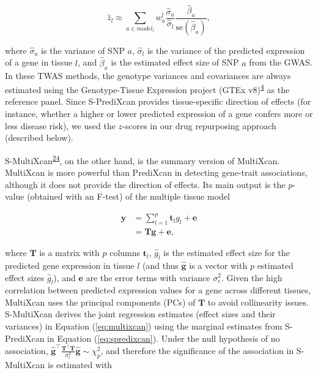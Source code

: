 \documentclass[
  a4paper,
]{article}
\begin{document}
\begin{equation}
\hat{z}_{l} \approx \sum_{a \in model_{l}} w_a^l \frac{\hat{\sigma}_a}{\hat{\sigma}_l} \frac{\hat{\beta}_a}{\mathrm{se}(\hat{\beta}_a)},
\label{eq:spredixcan}\end{equation}

where \(\hat{\sigma}_a\) is the variance of SNP \(a\), \(\hat{\sigma}_l\) is the variance of the predicted expression of a gene in tissue \(l\), and \(\hat{\beta}_a\) is the estimated effect size of SNP \(a\) from the GWAS.
In these TWAS methods, the genotype variances and covariances are always estimated using the Genotype-Tissue Expression project (GTEx v8)\textsuperscript{\protect\hyperlink{ref-9Pr9idng}{4}} as the reference panel.
Since S-PrediXcan provides tissue-specific direction of effects (for instance, whether a higher or lower predicted expression of a gene confers more or less disease risk), we used the \(z\)-scores in our drug repurposing approach (described below).

S-MultiXcan\textsuperscript{\protect\hyperlink{ref-1FFzCXo1s}{24}}, on the other hand, is the summary version of MultiXcan.
MultiXcan is more powerful than PrediXcan in detecting gene-trait associations, although it does not provide the direction of effects.
Its main output is the \(p\)-value (obtained with an F-test) of the multiple tissue model

\begin{equation}
\begin{split}
\mathbf{y} & = \sum_{l=1}^{p} \mathbf{t}_l g_l + \mathbf{e} \\
 & = \mathbf{T} \mathbf{g} + \mathbf{e},
\end{split}
\label{eq:multixcan}\end{equation}

where \(\mathbf{T}\) is a matrix with \(p\) columns \(\mathbf{t}_l\),
\(\hat{g}_l\) is the estimated effect size for the predicted gene expression in tissue \(l\) (and thus \(\hat{\mathbf{g}}\) is a vector with \(p\) estimated effect sizes \(\hat{g}_l\)),
and \(\mathbf{e}\) are the error terms with variance \(\sigma_{e}^{2}\).
Given the high correlation between predicted expression values for a gene across different tissues, MultiXcan uses the principal components (PCs) of \(\mathbf{T}\) to avoid collinearity issues.
S-MultiXcan derives the joint regression estimates (effect sizes and their variances) in Equation (\ref{eq:multixcan}) using the marginal estimates from S-PrediXcan in Equation (\ref{eq:spredixcan}).
Under the null hypothesis of no association, \(\hat{\mathbf{g}}^{\top} \frac{\mathbf{T}^{\top}\mathbf{T}}{\sigma_{e}^{2}} \hat{\mathbf{g}} \sim \chi_{p}^{2}\), and therefore the significance of the association in S-MultiXcan is estimated with
\end{document}
